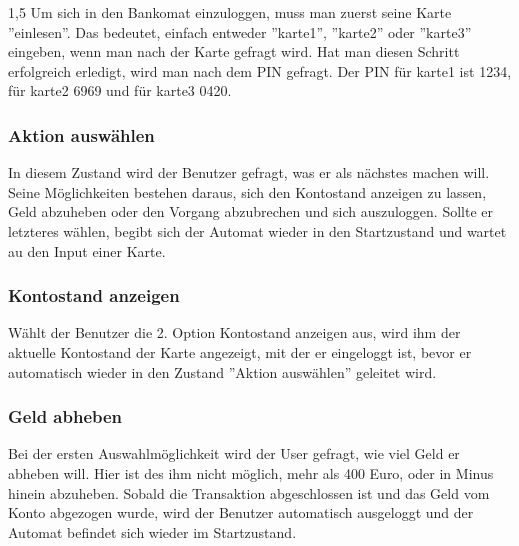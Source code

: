 \documentclass[a4paper]{article}
\begin{document}
\begin{spacing}{1,5}
Um sich in den Bankomat einzuloggen, muss man zuerst seine Karte ''einlesen''. Das bedeutet, einfach entweder ''karte1'', ''karte2'' oder ''karte3'' eingeben, wenn man nach der Karte gefragt wird. Hat man diesen Schritt erfolgreich erledigt, wird man nach dem PIN gefragt. Der PIN für karte1 ist 1234, für karte2 6969 und für karte3 0420.

\subsubsection{Aktion auswählen}

In diesem Zustand wird der Benutzer gefragt, was er als nächstes machen will. Seine Möglichkeiten bestehen daraus, sich den Kontostand anzeigen zu lassen, Geld abzuheben oder den Vorgang abzubrechen und sich auszuloggen. Sollte er letzteres wählen, begibt sich der Automat wieder in den Startzustand und wartet au den Input einer Karte.

\subsubsection{Kontostand anzeigen}

Wählt der Benutzer die 2. Option Kontostand anzeigen aus, wird ihm der aktuelle Kontostand der Karte angezeigt, mit der er eingeloggt ist, bevor er automatisch wieder in den Zustand ''Aktion auswählen'' geleitet wird.

\subsubsection{Geld abheben}

Bei der ersten Auswahlmöglichkeit wird der User gefragt, wie viel Geld er abheben will. Hier ist des ihm nicht möglich, mehr als 400 Euro, oder in Minus hinein abzuheben. Sobald die Transaktion abgeschlossen ist und das Geld vom Konto abgezogen wurde, wird der Benutzer automatisch ausgeloggt und der Automat befindet sich wieder im Startzustand.

\end{spacing}
\end{document}
